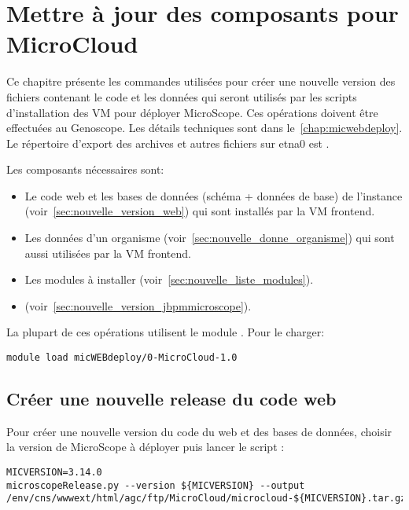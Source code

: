 \chapter{Mettre à jour des composants pour MicroCloud} \label{chap:creer_nouvelle_version}

Ce chapitre présente les commandes utilisées pour créer une nouvelle version
des fichiers contenant le code et les données qui seront utilisés
par les scripts d'installation des VM pour déployer MicroScope.
Ces opérations doivent être effectuées au Genoscope.
Les détails techniques sont dans le~\autoref{chap:micwebdeploy}.
Le répertoire d'export des archives et autres fichiers sur etna0 est .

Les composants nécessaires sont:
\begin{itemize}
    \item Le code web et les bases de données (schéma + données de base) de l'instance (voir~\autoref{sec:nouvelle_version_web})
          qui sont installés par la VM frontend.
    \item Les données d'un organisme (voir~\autoref{sec:nouvelle_donne_organisme})
          qui sont aussi utilisées par la VM frontend.
    \item Les modules à installer (voir~\autoref{sec:nouvelle_liste_modules}).
    \item {} (voir~\autoref{sec:nouvelle_version_jbpmmicroscope}).
\end{itemize}

La plupart de ces opérations utilisent le module \micWEBdeployVer.
Pour le charger:
\begin{lstlisting}[style=bash]
module load micWEBdeploy/0-MicroCloud-1.0
\end{lstlisting}

\section{Créer une nouvelle release du code web} \label{sec:nouvelle_version_web}

Pour créer une nouvelle version du code du web et des bases de données, choisir la version de MicroScope à déployer puis lancer le script  :
\begin{lstlisting}[style=bash]
MICVERSION=3.14.0
microscopeRelease.py --version ${MICVERSION} --output /env/cns/wwwext/html/agc/ftp/MicroCloud/microcloud-${MICVERSION}.tar.gz
\end{lstlisting}

